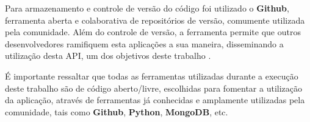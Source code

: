 Para armazenamento e controle de versão do código foi utilizado o \textbf{Github}, ferramenta aberta e colaborativa de repositórios de versão, comumente utilizada pela comunidade. Além do controle de versão, a ferramenta permite que outros desenvolvedores ramifiquem esta aplicações a sua maneira, disseminando a utilização desta API, um dos objetivos deste trabalho \cite{dabbish2012social}.

É importante ressaltar que todas as ferramentas utilizadas durante a execução deste trabalho são de código aberto/livre, escolhidas para fomentar a utilização da aplicação, através de ferramentas já conhecidas e amplamente utilizadas pela comunidade, tais como \textbf{Github}, \textbf{Python}, \textbf{MongoDB}, etc.